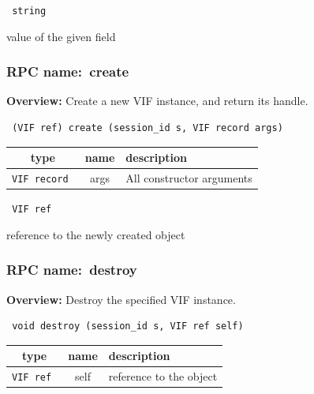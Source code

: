 \vspace{0.3cm}

{\tt
string
}


value of the given field
\vspace{0.3cm}
\vspace{0.3cm}
\vspace{0.3cm}
\subsubsection{RPC name:~create}

{\bf Overview:} 
Create a new VIF instance, and return its handle.

\begin{verbatim} (VIF ref) create (session_id s, VIF record args)\end{verbatim}



 
\vspace{0.3cm}
\begin{tabular}{|c|c|p{7cm}|}
 \hline
{\bf type} & {\bf name} & {\bf description} \\ \hline
{\tt VIF record } & args & All constructor arguments \\ \hline 

\end{tabular}

\vspace{0.3cm}

{\tt 
VIF ref
}


reference to the newly created object
\vspace{0.3cm}
\vspace{0.3cm}
\vspace{0.3cm}
\subsubsection{RPC name:~destroy}

{\bf Overview:} 
Destroy the specified VIF instance.

\begin{verbatim} void destroy (session_id s, VIF ref self)\end{verbatim}



 
\vspace{0.3cm}
\begin{tabular}{|c|c|p{7cm}|}
 \hline
{\bf type} & {\bf name} & {\bf description} \\ \hline
{\tt VIF ref } & self & reference to the object \\ \hline 

\end{tabular}

